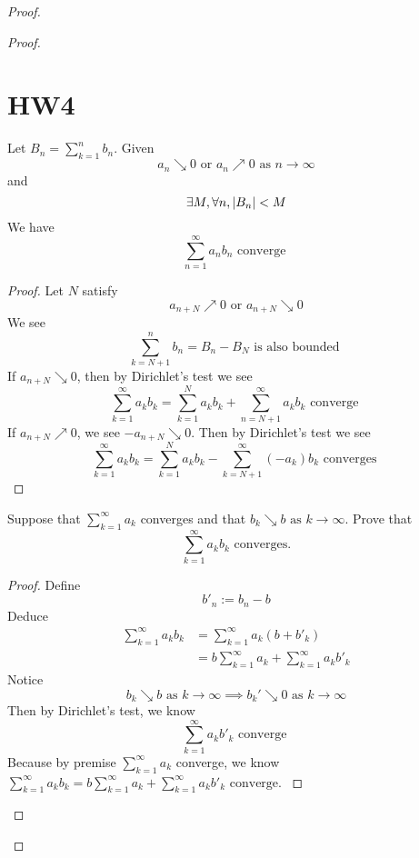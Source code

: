 \documentclass{report}
\begin{document}
\begin{proof}
\begin{proof}
\section{HW4}
\begin{theorem}
Let $B_n=\sum_{k=1}^n b_n$. Given
\begin{equation}
  a_n\searrow 0\text{ or }a_n\nearrow 0\text{ as }n\to\infty
\end{equation}
and 
\begin{equation}
\exists M, \forall n, |B_n|<M
\end{equation}
We have
\begin{equation}
\sum_{n=1}^\infty a_nb_n\text{ converge }
\end{equation}
\end{theorem}
\begin{proof}
Let $N$ satisfy
 \begin{equation}
a_{n+N}\nearrow 0\text{ or }a_{n+N}\searrow 0
\end{equation}
We see 
\begin{equation}
\sum_{k=N+1}^n b_n=B_n-B_N\text{ is also bounded }
\end{equation}
If $a_{n+N}\searrow 0$, then by Dirichlet's test we see
\begin{equation}
\sum_{k=1}^\infty a_kb_k=\sum_{k=1}^{N}a_kb_k+\sum_{n=N+1}^\infty a_kb_k\text{ converge }
\end{equation}
If $a_{n+N}\nearrow 0$, we see $-a_{n+N}\searrow 0$. Then by Dirichlet's test we see
\begin{equation}
\sum_{k=1}^\infty a_kb_k=\sum_{k=1}^N a_kb_k - \sum_{k=N+1}^\infty (-a_k)b_k\text{ converges }
\end{equation}
\end{proof}


\begin{question}{}{}
Suppose that $\sum_{k=1}^{\infty} a_k$ 
converges and that 
$b_k \searrow b \text{ as } k \to \infty$. Prove that 
\begin{equation}
  \sum_{k=1}^{\infty} a_k b_k \text{ converges.}
\end{equation}
\end{question}
\begin{proof}
Define
\begin{equation}
b'_n:=b_n-b
\end{equation}
Deduce
\begin{align}
  \sum_{k=1}^\infty a_kb_k&=\sum_{k=1}^\infty a_k(b+b'_k)\\
  &=b\sum_{k=1}^\infty a_k+\sum_{k=1}^\infty a_kb'_k
\end{align}
Notice
\begin{equation}
b_k\searrow b\text{ as }k\to\infty\implies b_k'\searrow 0\text{ as }k\to\infty
\end{equation}
Then by Dirichlet's test, we know
\begin{equation}
\sum_{k=1}^\infty a_kb'_k\text{ converge }
\end{equation}
Because by premise $\sum_{k=1}^\infty a_k$ converge, we know $\sum_{k=1}^\infty a_kb_k=b\sum_{k=1}^\infty a_k+\sum_{k=1}^\infty a_kb'_k\text{ converge. }$



\end{proof}
\end{proof}
\end{proof}
\end{document}
